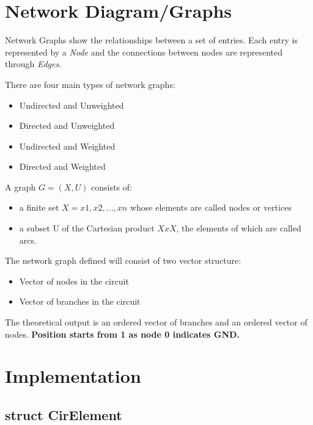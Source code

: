 \documentclass[a4paper, titlepage]{article}
\begin{document}
    \section{Network Diagram/Graphs}
    Network Graphs show the relationships between a set of entries. Each entry is represented by a \textit{Node} and the connections between nodes are represented through \textit{Edges}.
    \par
    There are four main types of network graphs:
    \begin{itemize}
        \item Undirected and Unweighted
        \item Directed and Unweighted
        \item Undirected and Weighted
        \item Directed and Weighted
    \end{itemize}
    \par
    A graph $G=(X,U)$ consists of: \cite{parse}
    \begin{itemize}
        \item a finite set $X = {x1,x2,...,xn}$ whose elements are called nodes or vertices
        \item a subset U of the Cartesian product $X x X$, the elements of which are called arcs.
    \end{itemize}
    The network graph defined will consist of two vector structure:
    \begin{itemize}
        \item Vector of nodes in the circuit
        \item Vector of branches in the circuit
    \end{itemize}
    The theoretical output is an ordered vector of branches and an ordered vector of nodes. 
    \textbf{Position starts from 1 as node 0 indicates GND.}

    \section{Implementation}
    \subsection{struct CirElement}
    
\end{document}
